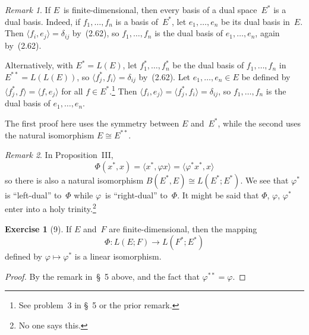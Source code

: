 \documentclass[letterpaper,12pt]{article}
\newcommand{\iso}{\cong}
\newcommand{\sprod}[2]{\langle#1,#2\rangle}
\theoremstyle{definition}
\newtheorem*{exer}{Exercise}
\theoremstyle{remark}
\newtheorem*{rmk}{Remark}
\begin{document}
\begin{rmk}
If \(E\)~is finite-dimensional, then every basis of a dual space~\(E^*\) is a dual basis. Indeed, if \(f_1,\ldots,f_n\) is a basis of~\(E^*\), let \(e_1,\ldots,e_n\) be its dual basis in~\(E\). Then \(\sprod{f_i}{e_j}=\delta_{ij}\) by~(2.62), so \(f_1,\ldots,f_n\) is the dual basis of \(e_1,\ldots,e_n\), again by~(2.62).

Alternatively, with \(E^*=L(E)\), let \(f_1^*,\ldots,f_n^*\) be the dual basis of \(f_1,\ldots,f_n\) in \(E^{**}=L(L(E))\), so \(\sprod{f_j^*}{f_i}=\delta_{ij}\) by~(2.62). Let \(e_1,\ldots,e_n\in E\) be defined by \(\sprod{f_j^*}{f}=\sprod{f}{e_j}\) for all \(f\in E^*\).\footnote{See problem~3 in \S~5 or the prior remark.} Then \(\sprod{f_i}{e_j}=\sprod{f_j^*}{f_i}=\delta_{ij}\), so \(f_1,\ldots,f_n\) is the dual basis of \(e_1,\ldots,e_n\).

The first proof here uses the symmetry between \(E\) and~\(E^*\), while the second uses the natural isomorphism \(E\iso E^{**}\).
\end{rmk}

\begin{rmk}
In Proposition~III,
\[\Phi(x^*,x)=\sprod{x^*}{\varphi x}=\sprod{\varphi^* x^*}{x}\]
so there is also a natural isomorphism \(B(E^*,E)\iso L(E^*;E^*)\). We see that \(\varphi^*\) is ``left-dual'' to~\(\Phi\) while \(\varphi\)~is ``right-dual'' to~\(\Phi\). It might be said that \(\Phi\), \(\varphi\), \(\varphi^*\) enter into a holy trinity.\footnote{No one says this.}
\end{rmk}

\begin{exer}[9]
If \(E\) and~\(F\) are finite-dimensional, then the mapping
\[\Phi:L(E;F)\to L(F^*;E^*)\]
defined by \(\varphi\mapsto\varphi^*\) is a linear isomorphism.
\end{exer}
\begin{proof}
By the remark in~\S~5 above, and the fact that \(\varphi^{**}=\varphi\).
\end{proof}
\end{document}
